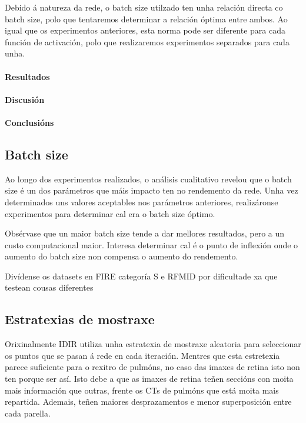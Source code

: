 Debido á natureza da rede, o batch size utilzado ten unha relación directa co batch size, polo que tentaremos determinar a relación óptima entre ambos.
Ao igual que os experimentos anteriores, esta norma pode ser diferente para cada función de activación, polo que realizaremos experimentos separados para cada unha.

\paragraph{Resultados}
\label{par:Resultados}

\paragraph{Discusión}
\label{par:Discusión}

\paragraph{Conclusións}
\label{par:Conclusións}


\subsection{Batch size}
\label{subsec:Batch size}

Ao longo dos experimentos realizados, o análisis cualitativo revelou que o batch size é un dos parámetros que máis impacto ten no rendemento da rede.
Unha vez determinados uns valores aceptables nos parámetros anteriores, realizáronse experimentos para determinar cal era o batch size óptimo.

Obsérvase que un maior batch size tende a dar mellores resultados, pero a un custo computacional maior. Interesa determinar cal é o punto de inflexión onde o aumento do batch size non compensa o aumento do rendemento.

Divídense os datasets en FIRE categoría S e RFMID por dificultade xa que testean cousas diferentes

\subsection{Estratexias de mostraxe}
\label{subsec:Estratexias de mostraxe}

Orixinalmente IDIR utiliza unha estratexia de mostraxe aleatoria para seleccionar os puntos que se pasan á rede en cada iteración.
Mentres que esta estretexia parece suficiente para o rexitro de pulmóns, no caso das imaxes de retina isto non ten porque ser así.
Isto debe a que as imaxes de retina teñen seccións con moita mais información que outras, frente os CTs de pulmóns que está moita mais repartida.
Ademais, teñen maiores desprazamentos e menor superposición entre cada parella. 

